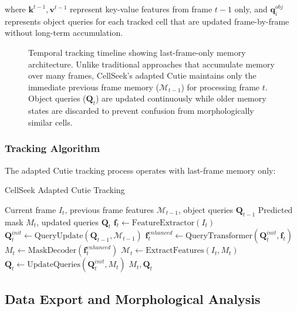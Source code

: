\documentclass[../cellseek_paper.tex]{subfiles}
\begin{document}
where $\mathbf{k}^{t-1}, \mathbf{v}^{t-1}$ represent key-value features from frame $t-1$ only, and $\mathbf{q}_i^{obj}$ represents object queries for each tracked cell that are updated frame-by-frame without long-term accumulation.

\begin{figure}[H]
  \centering
  
  \caption{Temporal tracking timeline showing last-frame-only memory architecture. Unlike traditional approaches that accumulate memory over many frames, CellSeek's adapted Cutie maintains only the immediate previous frame memory ($\mathcal{M}_{t-1}$) for processing frame $t$. Object queries ($\mathbf{Q}_t$) are updated continuously while older memory states are discarded to prevent confusion from morphologically similar cells.}
  \label{fig:temporal_timeline}
\end{figure}

\subsubsection{Tracking Algorithm}

The adapted Cutie tracking process operates with last-frame memory only:

\begin{algorithm}[H]
  \caption{CellSeek Adapted Cutie Tracking}
  \begin{algorithmic}[1]
    \REQUIRE Current frame $I_t$, previous frame features $\mathcal{M}_{t-1}$, object queries $\mathbf{Q}_{t-1}$
    \ENSURE Predicted mask $M_t$, updated queries $\mathbf{Q}_t$
    \STATE $\mathbf{f}_t \leftarrow \text{FeatureExtractor}(I_t)$
    \STATE $\mathbf{Q}_t^{init} \leftarrow \text{QueryUpdate}(\mathbf{Q}_{t-1}, \mathcal{M}_{t-1})$
    \STATE $\mathbf{f}_t^{enhanced} \leftarrow \text{QueryTransformer}(\mathbf{Q}_t^{init}, \mathbf{f}_t)$
    \STATE $M_t \leftarrow \text{MaskDecoder}(\mathbf{f}_t^{enhanced})$
    \STATE $\mathcal{M}_t \leftarrow \text{ExtractFeatures}(I_t, M_t)$ 
    \STATE $\mathbf{Q}_t \leftarrow \text{UpdateQueries}(\mathbf{Q}_t^{init}, M_t)$
    \RETURN $M_t, \mathbf{Q}_t$
  \end{algorithmic}
\end{algorithm}

\subsection{Data Export and Morphological Analysis}
\end{document}
